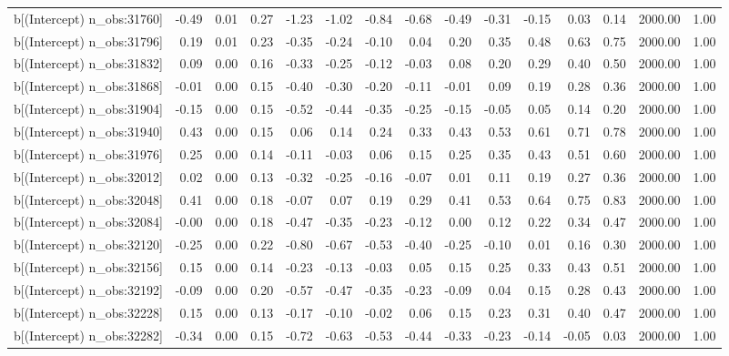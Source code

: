 \begin{table}[ht]
\begin{tabular}{rrrrrrrrrrrrrrr}
  b[(Intercept) n\_obs:31760] & -0.49 & 0.01 & 0.27 & -1.23 & -1.02 & -0.84 & -0.68 & -0.49 & -0.31 & -0.15 & 0.03 & 0.14 & 2000.00 & 1.00 \\ 
  b[(Intercept) n\_obs:31796] & 0.19 & 0.01 & 0.23 & -0.35 & -0.24 & -0.10 & 0.04 & 0.20 & 0.35 & 0.48 & 0.63 & 0.75 & 2000.00 & 1.00 \\ 
  b[(Intercept) n\_obs:31832] & 0.09 & 0.00 & 0.16 & -0.33 & -0.25 & -0.12 & -0.03 & 0.08 & 0.20 & 0.29 & 0.40 & 0.50 & 2000.00 & 1.00 \\ 
  b[(Intercept) n\_obs:31868] & -0.01 & 0.00 & 0.15 & -0.40 & -0.30 & -0.20 & -0.11 & -0.01 & 0.09 & 0.19 & 0.28 & 0.36 & 2000.00 & 1.00 \\ 
  b[(Intercept) n\_obs:31904] & -0.15 & 0.00 & 0.15 & -0.52 & -0.44 & -0.35 & -0.25 & -0.15 & -0.05 & 0.05 & 0.14 & 0.20 & 2000.00 & 1.00 \\ 
  b[(Intercept) n\_obs:31940] & 0.43 & 0.00 & 0.15 & 0.06 & 0.14 & 0.24 & 0.33 & 0.43 & 0.53 & 0.61 & 0.71 & 0.78 & 2000.00 & 1.00 \\ 
  b[(Intercept) n\_obs:31976] & 0.25 & 0.00 & 0.14 & -0.11 & -0.03 & 0.06 & 0.15 & 0.25 & 0.35 & 0.43 & 0.51 & 0.60 & 2000.00 & 1.00 \\ 
  b[(Intercept) n\_obs:32012] & 0.02 & 0.00 & 0.13 & -0.32 & -0.25 & -0.16 & -0.07 & 0.01 & 0.11 & 0.19 & 0.27 & 0.36 & 2000.00 & 1.00 \\ 
  b[(Intercept) n\_obs:32048] & 0.41 & 0.00 & 0.18 & -0.07 & 0.07 & 0.19 & 0.29 & 0.41 & 0.53 & 0.64 & 0.75 & 0.83 & 2000.00 & 1.00 \\ 
  b[(Intercept) n\_obs:32084] & -0.00 & 0.00 & 0.18 & -0.47 & -0.35 & -0.23 & -0.12 & 0.00 & 0.12 & 0.22 & 0.34 & 0.47 & 2000.00 & 1.00 \\ 
  b[(Intercept) n\_obs:32120] & -0.25 & 0.00 & 0.22 & -0.80 & -0.67 & -0.53 & -0.40 & -0.25 & -0.10 & 0.01 & 0.16 & 0.30 & 2000.00 & 1.00 \\ 
  b[(Intercept) n\_obs:32156] & 0.15 & 0.00 & 0.14 & -0.23 & -0.13 & -0.03 & 0.05 & 0.15 & 0.25 & 0.33 & 0.43 & 0.51 & 2000.00 & 1.00 \\ 
  b[(Intercept) n\_obs:32192] & -0.09 & 0.00 & 0.20 & -0.57 & -0.47 & -0.35 & -0.23 & -0.09 & 0.04 & 0.15 & 0.28 & 0.43 & 2000.00 & 1.00 \\ 
  b[(Intercept) n\_obs:32228] & 0.15 & 0.00 & 0.13 & -0.17 & -0.10 & -0.02 & 0.06 & 0.15 & 0.23 & 0.31 & 0.40 & 0.47 & 2000.00 & 1.00 \\ 
  b[(Intercept) n\_obs:32282] & -0.34 & 0.00 & 0.15 & -0.72 & -0.63 & -0.53 & -0.44 & -0.33 & -0.23 & -0.14 & -0.05 & 0.03 & 2000.00 & 1.00 \\ 

\end{tabular}
\end{table}
